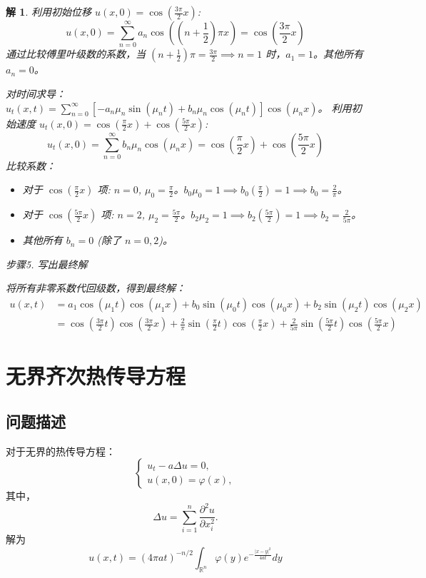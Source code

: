 \documentclass[12pt,a4paper]{article}
\numberwithin{subsection}{section}   %
\numberwithin{subsubsection}{subsection}
\theoremstyle{plain}
\newtheorem{solution}{解}[subsection]  %
\theoremstyle{definition}
\theoremstyle{remark}
\theoremstyle{remark}
\begin{document}
\begin{solution}
		\noindent
		利用初始位移 $u(x,0) = \cos(\frac{3\pi}{2}x)$:
		\[ u(x,0) = \sum_{n=0}^\infty a_n \cos\left((n+\frac{1}{2})\pi x\right) = \cos\left(\frac{3\pi}{2}x\right) \]
		通过比较傅里叶级数的系数，当 $(n+\frac{1}{2})\pi = \frac{3\pi}{2} \implies n=1$ 时，$a_1=1$。其他所有 $a_n=0$。
		
		\noindent
		对时间求导：$u_t(x,t) = \sum_{n=0}^\infty \left[-a_n\mu_n \sin(\mu_n t) + b_n\mu_n \cos(\mu_n t)\right] \cos(\mu_n x)$。
		利用初始速度 $u_t(x,0) = \cos(\frac{\pi}{2}x) + \cos(\frac{5\pi}{2}x)$:
		\[ u_t(x,0) = \sum_{n=0}^\infty b_n\mu_n \cos(\mu_n x) = \cos\left(\frac{\pi}{2}x\right) + \cos\left(\frac{5\pi}{2}x\right) \]
		比较系数：
		\begin{itemize}
			\item 对于 $\cos(\frac{\pi}{2}x)$ 项: $n=0$, $\mu_0=\frac{\pi}{2}$。$b_0\mu_0 = 1 \implies b_0\left(\frac{\pi}{2}\right)=1 \implies b_0 = \frac{2}{\pi}$。
			\item 对于 $\cos(\frac{5\pi}{2}x)$ 项: $n=2$, $\mu_2=\frac{5\pi}{2}$。$b_2\mu_2 = 1 \implies b_2\left(\frac{5\pi}{2}\right)=1 \implies b_2 = \frac{2}{5\pi}$。
			\item 其他所有 $b_n=0$ (除了 $n=0,2$)。
		\end{itemize}
		
	步骤5. 写出最终解
		
		\noindent
		将所有非零系数代回级数，得到最终解：
		\begin{align*}
			u(x,t) &= a_1\cos(\mu_1 t)\cos(\mu_1 x) + b_0\sin(\mu_0 t)\cos(\mu_0 x) + b_2\sin(\mu_2 t)\cos(\mu_2 x) \\
			&= \cos\left(\frac{3\pi}{2}t\right)\cos\left(\frac{3\pi}{2}x\right) + \frac{2}{\pi}\sin\left(\frac{\pi}{2}t\right)\cos\left(\frac{\pi}{2}x\right) + \frac{2}{5\pi}\sin\left(\frac{5\pi}{2}t\right)\cos\left(\frac{5\pi}{2}x\right)
		\end{align*}
	\end{solution}
	
		\newpage
	\section{无界齐次热传导方程}
	\subsection{问题描述}
	对于无界的热传导方程：
	\begin{equation}
		\begin{cases}\label{wujierechuandao}
			u_t -a\Delta u = 0, \\
			u(x, 0) = \varphi(x),
		\end{cases}
	\end{equation}
	其中，
	\begin{equation}
		\Delta u = \sum_{i=1}^n \frac{\partial^2 u}{\partial x_i^2}.
	\end{equation}
	解为
	\begin{equation}
	u(x, t) = (4\pi a t)^{-n/2} \int_{\mathbb{R}^n} \varphi(y) e^{-\frac{|x - y|^2}{4a t}} dy
\end{equation}
	
\end{document}
